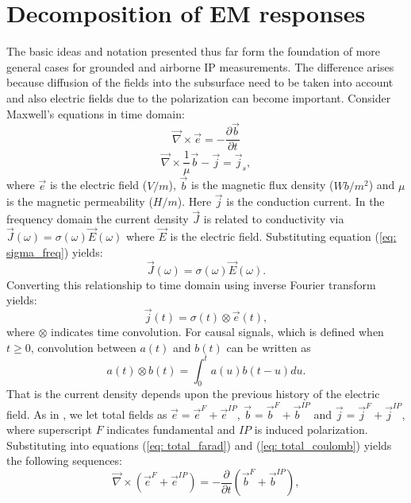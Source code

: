 \documentclass[a4paper, 11pt]{article}
\newcommand{\curl}{{\vec \nabla}\times}
\newcommand {\J}{{\vec J}}
\newcommand {\E}{{\vec E}}
\renewcommand {\j}  { {\vec j} }
\renewcommand {\b}  { {\vec b} }
\newcommand {\e}  { {\vec e} }
\begin{document}
\section{Decomposition of EM responses}
The basic ideas and notation presented thus far form the foundation of more general cases for grounded and airborne IP measurements. 
The difference arises because diffusion of the fields into the subsurface need to be taken into account and also electric fields due to the polarization can become important. 
Consider Maxwell's equations in time domain:
\begin{equation}
  \curl{\e} = -\frac{\partial \b}{\partial t}
  \label{eq: total_farad}
\end{equation}
\begin{equation}
  \curl{\frac{1}{\mu}\b} - \j= \j_{s},
  \label{eq: total_coulomb}
\end{equation}
where $\e$ is the electric field ($V/m$), $\b$ is the magnetic flux density ($Wb/m^2$) and $\mu$ is the magnetic permeability ($H/m$). Here $\j$ is the conduction current. In the frequency domain the current density $\J$ is related to conductivity via $\J(\omega) = \sigma(\omega)\E(\omega)$ where $\E$ is the electric field. Substituting equation (\ref{eq: sigma_freq}) yields:
\begin{equation}
  \J(\omega) = \sigma(\omega)\E(\omega).
\end{equation}
Converting this relationship to time domain using inverse Fourier transform yields:
\begin{equation}
  \j(t) = \sigma(t)\otimes \e(t),
  \label{eq: ohmslaw1}
\end{equation}
where $\otimes$ indicates time convolution. 
For causal signals, which is defined when $t \ge 0$, convolution between $a(t)$ and $b(t)$ can be written as
\begin{equation}
  a(t) \otimes b(t) = \int_0^t a(u) b(t-u) du.
  \label{eq: convolution}
\end{equation}
That is the current density depends upon the previous history of the electric field.
As in \cite{Smith1988a}, we let total fields as $\e = \e^{F} + \e^{IP}$, $\b = \b^{F} + \b^{IP}$ and $\j = \j^{F} + \j^{IP}$, where superscript $F$ indicates fundamental and $IP$ is induced polarization.
Substituting into equations (\ref{eq: total_farad}) and (\ref{eq: total_coulomb}) yields the following sequences:
\begin{equation}
  \curl({\e^{F}+\e^{IP}}) = -\frac{\partial}{\partial t} (\b^{F}+\b^{IP}),
\end{equation}
\end{document}
